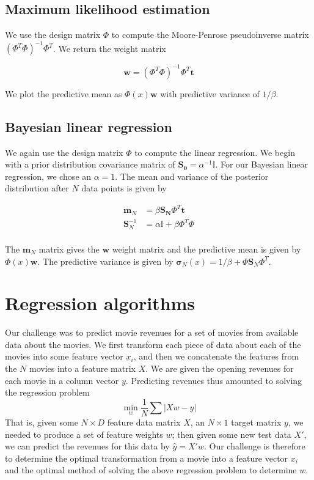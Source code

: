 \documentclass[11pt]{amsart}
\begin{document}
\subsection{Maximum likelihood estimation}

We use the design matrix $\Phi$ to compute the Moore-Penrose pseudoinverse matrix $(\Phi ^ T \Phi)^{-1} \Phi ^T$. We return the weight matrix 

$$\mathbf{w} = (\Phi ^ T \Phi)^{-1} \Phi ^T \mathbf{t}$$

We plot the predictive mean as $\Phi(x) \mathbf{w}$ with predictive variance of $1 / \beta$.

\subsection{Bayesian linear regression}

We again use the design matrix $\Phi$ to compute the linear regression. We begin with a prior distribution covariance matrix of $\mathbf{S_0} = \alpha ^{-1} \mathbb{I}$. For our Bayesian linear regression, we chose an $\alpha = 1$. The mean and variance of the posterior distribution after $N$ data points is given by

\begin{align*}
\mathbf{m}_N &= \beta \mathbf{S_N} \Phi ^ T \mathbf{t} \\
\mathbf{S}_N^{-1} &= \alpha \mathbb{I} + \beta \Phi ^ T \Phi \\
\end{align*}

The $\mathbf{m}_N$ matrix gives the $\mathbf{w}$ weight matrix and the predictive mean is given by $\Phi(x) \mathbf{w}$. The predictive variance is given by $\mathbf{\sigma}_N(x) = 1 / \beta + \Phi \mathbf{S}_N \Phi ^ T$. \\

\section{Regression algorithms}

Our challenge was to predict movie revenues for a set of movies from available data about the movies. We first transform each piece of data about each of the movies into some feature vector $x_i$, and then we concatenate the features from the $N$ movies into a feature matrix $X$. We are given the opening revenues for each movie in a column vector $y$. Predicting revenues thus amounted to solving the regression problem
$$\min_w \frac{1}{N}\sum |X w - y|$$
That is, given some $N \times D$ feature data matrix $X$, an $N \times 1$ target matrix $y$, we needed to produce a set of feature weights $w$; then given some new test data $X'$, we can predict the revenues for this data by $\hat{y} = X' w$. Our challenge is therefore to determine the optimal transformation from a movie into a feature vector $x_i$ and the optimal method of solving the above regression problem to determine $w$. 
\end{document}
